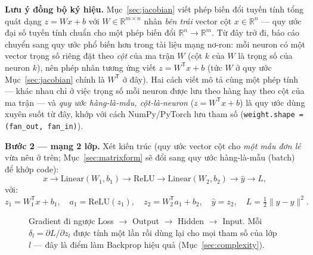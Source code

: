 \documentclass[12pt,a4paper]{article}
\newcommand{\T}{^{\mathsf{T}}}
\begin{document}
\textbf{Lưu ý đồng bộ ký hiệu.} Mục~\ref{sec:jacobian} viết phép biến đổi
tuyến tính tổng quát dạng $z=Wx+b$ với $W\in\mathbb R^{m\times n}$ nhân
\emph{bên trái} vector cột $x\in\mathbb R^n$ --- quy ước đại số tuyến tính
chuẩn cho một phép biến đổi $\mathbb R^n\to\mathbb R^m$. Từ đây trở đi,
báo cáo chuyển sang quy ước phổ biến hơn trong tài liệu mạng nơ-ron: mỗi
neuron có một vector trọng số riêng đặt theo \emph{cột} của ma trận $W$
(cột $k$ của $W$ là trọng số của neuron $k$), nên phép nhân tương ứng viết
$z=W\T x+b$ (tức $W$ ở quy ước Mục~\ref{sec:jacobian} chính là $W\T$ ở đây).
Hai cách viết mô tả cùng một phép tính --- khác nhau chỉ ở việc trọng số
mỗi neuron được lưu theo hàng hay theo cột của ma trận --- và \emph{quy
ước hàng-là-mẫu, cột-là-neuron} ($z=W\T x+b$) là quy ước dùng xuyên suốt
từ đây, khớp với cách NumPy/PyTorch lưu tham số (\texttt{weight.shape =
(fan\_out, fan\_in)}).

\textbf{Bước 2 --- mạng 2 lớp.} Xét kiến trúc (quy ước vector cột cho
\emph{một mẫu đơn lẻ} vừa nêu ở trên; Mục~\ref{sec:matrixform}
sẽ đổi sang quy ước hàng-là-mẫu (batch) để khớp code):
$$x \to \mathrm{Linear}(W_1,b_1) \to \mathrm{ReLU} \to \mathrm{Linear}(W_2,b_2)
\to \hat y \to L,$$
với:
$$z_1 = W_1\T x + b_1,\quad a_1=\mathrm{ReLU}(z_1),\quad
z_2 = W_2\T a_1+b_2,\quad \hat y = z_2,\quad L=\tfrac12\lVert \hat y-y\rVert^2.$$

\begin{figure}[H]
\centering
{}
\caption{Gradient đi ngược Loss $\to$ Output $\to$ Hidden $\to$ Input. Mỗi
$\delta_l=\partial L/\partial z_l$ được tính một lần rồi dùng lại cho mọi
tham số của lớp $l$ --- đây là điểm làm Backprop hiệu quả (Mục~\ref{sec:complexity}).}
\label{fig:2layerflow}
\end{figure}
\end{document}
